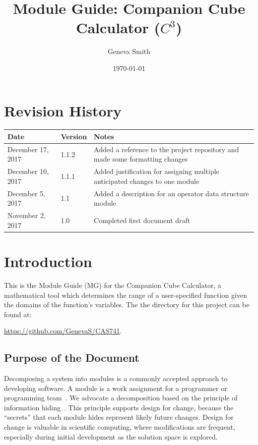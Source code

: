 \documentclass[12pt, titlepage]{article}
\newcommand{\progname}{Companion Cube Calculator} %
\newcommand{\prognameAbbrv}{$C^{3}$}
\begin{document}
\title{Module Guide: \progname{} (\prognameAbbrv{})} 
\author{Geneva Smith}
\date{\today}

\maketitle


\section{Revision History}

\begin{tabularx}{\textwidth}{p{3.5cm}p{2cm}X}
\toprule {\bf Date} & {\bf Version} & {\bf Notes}\\
\midrule
December 17, 2017 & 1.1.2 & Added a reference to the project repository and 
made some formatting changes \\
December 10, 2017 & 1.1.1 & Added justification for assigning multiple 
anticipated changes to one module \\
December 5, 2017 & 1.1 & Added a description for an operator data structure module\\
November 2, 2017 & 1.0 & Completed first document draft\\
\bottomrule
\end{tabularx}

\newpage

\tableofcontents

\listoftables

\listoffigures

\newpage


\section{Introduction}
This is the Module Guide (MG) for the Companion Cube Calculator, a mathematical 
tool which determines the range of a user-specified function given the domains 
of the function's variables. The the directory for this project can be found at:

\begin{center}
	\href{https://github.com/GenevaS/CAS741}{https://github.com/GenevaS/CAS741}.
\end{center} 

\subsection{Purpose of the Document}
Decomposing a system into modules is a commonly accepted approach to developing
software.  A module is a work assignment for a programmer or programming
team~\citep{ParnasEtAl1984}.  We advocate a decomposition
based on the principle of information hiding~\citep{Parnas1972a}.  This
principle supports design for change, because the ``secrets'' that each module
hides represent likely future changes.  Design for change is valuable in 
scientific computing, where modifications are frequent, especially during 
initial development as the solution space is explored.  
\end{document}
